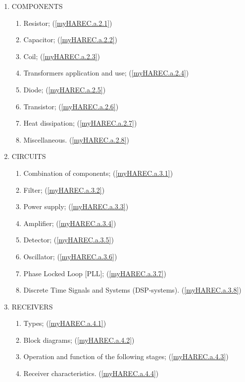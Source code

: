 \begin{enumerate}
\item COMPONENTS
\begin{enumerate}[noitemsep]
\item Resistor; (\ref{myHAREC.a.2.1})\label{HAREC.a.2.1}
\item Capacitor; (\ref{myHAREC.a.2.2})\label{HAREC.a.2.2}
\item Coil; (\ref{myHAREC.a.2.3})\label{HAREC.a.2.3}
\item Transformers application and use; (\ref{myHAREC.a.2.4})\label{HAREC.a.2.4}
\item Diode; (\ref{myHAREC.a.2.5})\label{HAREC.a.2.5}
\item Transistor; (\ref{myHAREC.a.2.6})\label{HAREC.a.2.6}
\item Heat dissipation; (\ref{myHAREC.a.2.7})\label{HAREC.a.2.7}
\item Miscellaneous. (\ref{myHAREC.a.2.8})\label{HAREC.a.2.8}
\end{enumerate}
\item CIRCUITS
\begin{enumerate}[noitemsep]
\item Combination of components; (\ref{myHAREC.a.3.1})\label{HAREC.a.3.1}
\item Filter; (\ref{myHAREC.a.3.2})\label{HAREC.a.3.2}
\item Power supply; (\ref{myHAREC.a.3.3})\label{HAREC.a.3.3}
\item Amplifier; (\ref{myHAREC.a.3.4})\label{HAREC.a.3.4}
\item Detector; (\ref{myHAREC.a.3.5})\label{HAREC.a.3.5}
\item Oscillator; (\ref{myHAREC.a.3.6})\label{HAREC.a.3.6}
\item Phase Locked Loop [PLL]; (\ref{myHAREC.a.3.7})\label{HAREC.a.3.7}
\item Discrete Time Signals and Systems (DSP-systems). (\ref{myHAREC.a.3.8})\label{HAREC.a.3.8}
\end{enumerate}
\item RECEIVERS
\begin{enumerate}[noitemsep]
\item Types; (\ref{myHAREC.a.4.1})\label{HAREC.a.4.1}
\item Block diagrams; (\ref{myHAREC.a.4.2})\label{HAREC.a.4.2}
\item Operation and function of the following stages; (\ref{myHAREC.a.4.3})\label{HAREC.a.4.3}
\item Receiver characteristics. (\ref{myHAREC.a.4.4})\label{HAREC.a.4.4}
\end{enumerate}

\end{enumerate}
